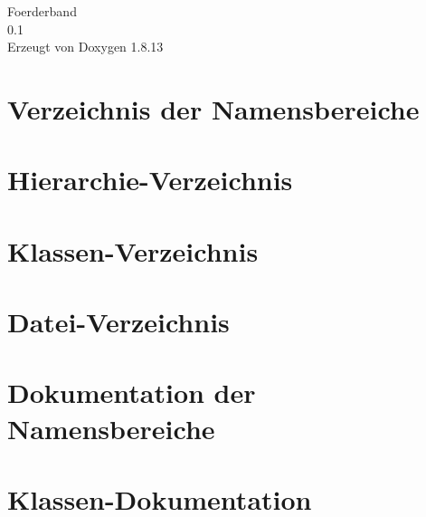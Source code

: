 \documentclass[twoside]{book}
\newcommand{\+}{\discretionary{\mbox{\scriptsize$\hookleftarrow$}}{}{}}
\newcommand{\clearemptydoublepage}{%
  \newpage{\pagestyle{empty}\cleardoublepage}%
}
\begin{document}
\hypersetup{pageanchor=false,
             bookmarksnumbered=true,
             pdfencoding=unicode
            }
\begin{titlepage}
\vspace*{7cm}
\begin{center}%
{\Large Foerderband \\[1ex]\large 0.\+1 }\\
\vspace*{1cm}
{\large Erzeugt von Doxygen 1.8.13}\\
\end{center}
\end{titlepage}
\clearemptydoublepage
{}
\tableofcontents
\clearemptydoublepage
{}
\hypersetup{pageanchor=true}

\chapter{Verzeichnis der Namensbereiche}

\chapter{Hierarchie-\/\+Verzeichnis}

\chapter{Klassen-\/\+Verzeichnis}

\chapter{Datei-\/\+Verzeichnis}

\chapter{Dokumentation der Namensbereiche}

\chapter{Klassen-\/\+Dokumentation}





























\end{document}
